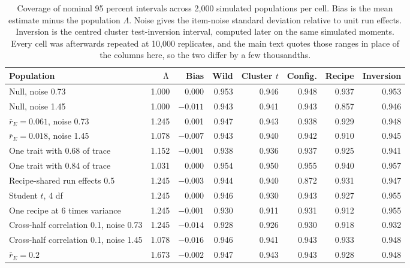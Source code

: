 \begin{table}[!htb]
\centering
\caption{Coverage of nominal 95 percent intervals across 2,000 simulated populations per cell. Bias is the mean estimate minus the population $\Lambda$. Noise gives the item-noise standard deviation relative to unit run effects. Inversion is the centred cluster test-inversion interval, computed later on the same simulated moments. Every cell was afterwards repeated at 10,000 replicates, and the main text quotes those ranges in place of the columns here, so the two differ by a few thousandths.}
\label{tab:coverage}
\small\setlength{\tabcolsep}{4pt}\renewcommand{\arraystretch}{1.1}
\begin{tabular}{lrrrrrrr}
\toprule
Population & $\Lambda$ & Bias & Wild & Cluster $t$ & Config. & Recipe & Inversion\\
\midrule
Null, noise 0.73 & 1.000 & 0.000 & 0.953 & 0.946 & 0.948 & 0.937 & 0.953\\
Null, noise 1.45 & 1.000 & $-0.011$ & 0.943 & 0.941 & 0.943 & 0.857 & 0.946\\
$\bar r_E=0.061$, noise 0.73 & 1.245 & 0.001 & 0.947 & 0.943 & 0.938 & 0.929 & 0.948\\
$\bar r_E=0.018$, noise 1.45 & 1.078 & $-0.007$ & 0.943 & 0.940 & 0.942 & 0.910 & 0.945\\
One trait with 0.68 of trace & 1.152 & $-0.001$ & 0.938 & 0.936 & 0.937 & 0.925 & 0.941\\
One trait with 0.84 of trace & 1.031 & 0.000 & 0.954 & 0.950 & 0.955 & 0.940 & 0.957\\
Recipe-shared run effects 0.5 & 1.245 & $-0.003$ & 0.944 & 0.940 & 0.872 & 0.931 & 0.947\\
Student $t$, 4 df & 1.245 & 0.000 & 0.946 & 0.930 & 0.943 & 0.927 & 0.955\\
One recipe at 6 times variance & 1.245 & $-0.001$ & 0.930 & 0.911 & 0.931 & 0.912 & 0.955\\
Cross-half correlation 0.1, noise 0.73 & 1.245 & $-0.014$ & 0.928 & 0.926 & 0.930 & 0.918 & 0.932\\
Cross-half correlation 0.1, noise 1.45 & 1.078 & $-0.016$ & 0.946 & 0.941 & 0.943 & 0.933 & 0.948\\
$\bar r_E=0.2$ & 1.673 & $-0.002$ & 0.947 & 0.943 & 0.943 & 0.928 & 0.948\\
\bottomrule
\end{tabular}
\end{table}

